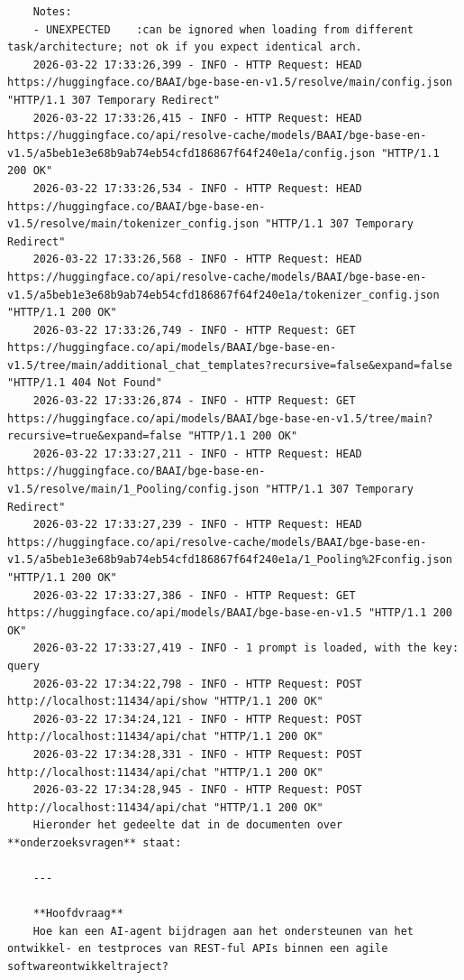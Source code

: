 \begin{verbatim}
    Notes:
    - UNEXPECTED    :can be ignored when loading from different task/architecture; not ok if you expect identical arch.      
    2026-03-22 17:33:26,399 - INFO - HTTP Request: HEAD https://huggingface.co/BAAI/bge-base-en-v1.5/resolve/main/config.json "HTTP/1.1 307 Temporary Redirect"
    2026-03-22 17:33:26,415 - INFO - HTTP Request: HEAD https://huggingface.co/api/resolve-cache/models/BAAI/bge-base-en-v1.5/a5beb1e3e68b9ab74eb54cfd186867f64f240e1a/config.json "HTTP/1.1 200 OK"
    2026-03-22 17:33:26,534 - INFO - HTTP Request: HEAD https://huggingface.co/BAAI/bge-base-en-v1.5/resolve/main/tokenizer_config.json "HTTP/1.1 307 Temporary Redirect"
    2026-03-22 17:33:26,568 - INFO - HTTP Request: HEAD https://huggingface.co/api/resolve-cache/models/BAAI/bge-base-en-v1.5/a5beb1e3e68b9ab74eb54cfd186867f64f240e1a/tokenizer_config.json "HTTP/1.1 200 OK"
    2026-03-22 17:33:26,749 - INFO - HTTP Request: GET https://huggingface.co/api/models/BAAI/bge-base-en-v1.5/tree/main/additional_chat_templates?recursive=false&expand=false "HTTP/1.1 404 Not Found"
    2026-03-22 17:33:26,874 - INFO - HTTP Request: GET https://huggingface.co/api/models/BAAI/bge-base-en-v1.5/tree/main?recursive=true&expand=false "HTTP/1.1 200 OK"
    2026-03-22 17:33:27,211 - INFO - HTTP Request: HEAD https://huggingface.co/BAAI/bge-base-en-v1.5/resolve/main/1_Pooling/config.json "HTTP/1.1 307 Temporary Redirect"
    2026-03-22 17:33:27,239 - INFO - HTTP Request: HEAD https://huggingface.co/api/resolve-cache/models/BAAI/bge-base-en-v1.5/a5beb1e3e68b9ab74eb54cfd186867f64f240e1a/1_Pooling%2Fconfig.json "HTTP/1.1 200 OK"
    2026-03-22 17:33:27,386 - INFO - HTTP Request: GET https://huggingface.co/api/models/BAAI/bge-base-en-v1.5 "HTTP/1.1 200 OK"
    2026-03-22 17:33:27,419 - INFO - 1 prompt is loaded, with the key: query
    2026-03-22 17:34:22,798 - INFO - HTTP Request: POST http://localhost:11434/api/show "HTTP/1.1 200 OK"
    2026-03-22 17:34:24,121 - INFO - HTTP Request: POST http://localhost:11434/api/chat "HTTP/1.1 200 OK"
    2026-03-22 17:34:28,331 - INFO - HTTP Request: POST http://localhost:11434/api/chat "HTTP/1.1 200 OK"
    2026-03-22 17:34:28,945 - INFO - HTTP Request: POST http://localhost:11434/api/chat "HTTP/1.1 200 OK"
    Hieronder het gedeelte dat in de documenten over **onderzoeksvragen** staat:
    
    ---
    
    **Hoofdvraag**
    Hoe kan een AI‑agent bijdragen aan het ondersteunen van het ontwikkel‑ en testproces van REST‑ful APIs binnen een agile softwareontwikkeltraject?
    

\end{verbatim}
